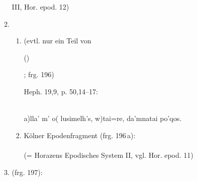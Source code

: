 \documentclass[11pt]{article}
\begin{document}
\begin{enumerate}
\begin{enumerate}
  III, Hor. epod. 12)
\item
\begin{enumerate}
\item {} (evtl. nur ein Teil von
  \addtocounter{enumiii}{1}()\addtocounter{enumiii}{-1};
  frg. 196)\par Heph. 19,9, p. 50,14--17:\par {\\
    a)lla' m' o( lusimelh's, w)tai=re, da'mnatai po'qos.}

\item K\"olner Epodenfragment (frg. 196\,a): \\
\metra{\a\m\b\m\s\a\m\b\m\s\a\m\b\m\cc\m\bb\m\bb\m\cc\a\m\b\m\s\a
\m\b\m}\\ (= Horazens Epodisches System II, vgl. Hor. epod. 11)

\end{enumerate}
\item {} (frg. 197): 
\metra{\m\b\m\a\s\m\b\m\a\s\m\b\m}

\end{enumerate}
\end{enumerate}
\end{document}
